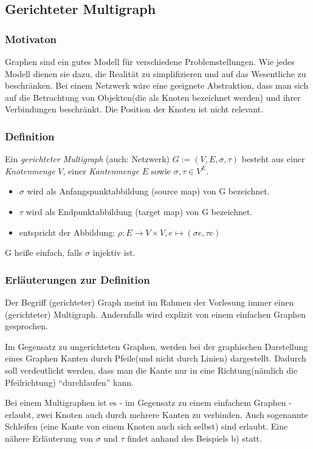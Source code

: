 \subsection{Gerichteter Multigraph}
\subsubsection{Motivaton}
Graphen sind ein gutes Modell für verschiedene Problemstellungen.
Wie jedes Modell dienen sie dazu, die Realität zu simplifizieren und auf das Wesentliche zu beschränken.
Bei einem Netzwerk wäre eine geeignete Abstraktion, dass man sich auf die Betrachtung von Objekten(die als Knoten bezeichnet werden) und ihrer Verbindungen beschränkt.
Die Position der Knoten ist nicht relevant.

\subsubsection{Definition}
Ein \emph{gerichteter Multigraph} (auch: Netzwerk) $G:= (V,E,\sigma,\tau) $ besteht aus einer \emph{Knotenmenge} $V$, einer \emph{Kantenmenge} $E$ sowie
$\sigma , \tau \in V^E $.
\begin{itemize}
\item $\sigma $ wird als Anfangspunktabbildung (source map) von G bezeichnet.
\item $\tau $ wird als Endpunktabbildung (target map) von G bezeichnet.
\item entspricht der Abbildung: $\rho : E \rightarrow V \times V, e \mapsto (\sigma e, \tau e) $
\end{itemize}
G heiße einfach, falls $\sigma$ injektiv ist.

\subsubsection{Erläuterungen zur Definition}
Der Begriff (gerichteter) Graph meint im Rahmen der Vorlesung immer einen (gerichteter) Multigraph.
Andernfalls wird explizit von einem einfachen Graphen gesprochen.

Im Gegensatz zu ungerichteten Graphen, werden bei der graphischen Darstellung eines Graphen Kanten durch Pfeile(und nicht durch Linien) dargestellt.
Dadurch soll verdeutlicht werden, dass man die Kante nur in eine Richtung(nämlich die Pfeilrichtung) ``durchlaufen'' kann.

Bei einem Multigraphen ist es - im Gegensatz zu einem einfachem Graphen - erlaubt, zwei Knoten auch durch mehrere Kanten zu verbinden.
Auch sogenannte Schleifen (eine Kante von einem Knoten auch sich selbst) sind erlaubt.
Eine nähere Erläuterung von $\sigma$ und $\tau$ findet anhand des Beispiels b) statt.

